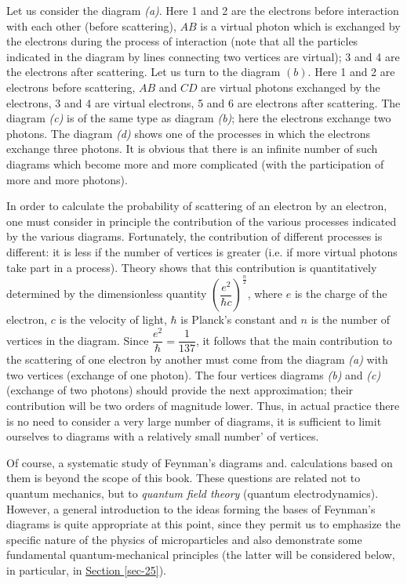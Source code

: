 \documentclass[a4paper,sfsidenotes,colorlinks=true]{tufte-book}
\numberwithin{equation}{section}
\numberwithin{figure}{section}
\begin{document}
Let us consider the diagram \emph{(a)}. Here 1 and 2 are the electrons
before interaction with each other (before scattering), $AB$ is a
virtual photon which is exchanged by the electrons during the process
of interaction (note that all the particles indicated in the diagram
by lines connecting two vertices are virtual); 3 and 4 are the
electrons after scattering. Let us turn to the diagram $(b)$. Here 1
and 2 are electrons before scattering, $AB$ and $CD$ are virtual
photons exchanged by the electrons, 3 and 4 are virtual electrons, 5
and 6 are electrons after scattering. The diagram \emph{(c)} is of the
same type as diagram \emph{(b)}; here the electrons exchange two
photons. The diagram \emph{(d)} shows one of the processes in which
the electrons exchange three photons. It is obvious that there is an
infinite number of such diagrams which become more and more
complicated (with the participation of more and more photons).


In order to calculate the probability of scattering of an electron by
an electron, one must consider in principle the contribution of the
various processes indicated by the various diagrams. Fortunately, the
contribution of different processes is different: it is less if the
number of vertices is greater (i.e. if more virtual photons take part
in a process). Theory shows that this contribution is quantitatively
determined by the dimensionless quantity $\left( \dfrac{e^{2}}{\hbar
    c}\right)^{\frac{n}{2}}$, where $e$ is the charge of the electron,
$c$ is the velocity of light, $\hbar$ is Planck's constant and $n$ is
the number of vertices in the diagram. Since $\dfrac{e^{2}}{\hbar} =
\dfrac{1}{137}$, it follows that the main contribution to the
scattering of one electron by another must come from the diagram
\emph{(a)} with two vertices (exchange of one photon). The four
vertices diagrams \emph{(b)} and \emph{(c)} (exchange of two photons)
should provide the next approximation; their contribution will be two
orders of magnitude lower. Thus, in actual practice there is no need
to consider a very large number of diagrams, it is sufficient to limit
ourselves to diagrams with a relatively small number' of vertices.


Of course, a systematic study of Feynman's diagrams and. calculations
based on them is beyond the scope of this book. These questions are
related not to quantum mechanics, but to \emph{quantum field theory}
(quantum electrodynamics). However, a general introduction to the ideas
forming the bases of Feynman's diagrams is quite appropriate at this
point, since they permit us to emphasize the specific nature of the
physics of microparticles and also demonstrate some fundamental
quantum-mechanical principles (the latter will be considered below, in
particular, in \hyperref[sec-25]{Section \ref{sec-25}}).
\end{document}

